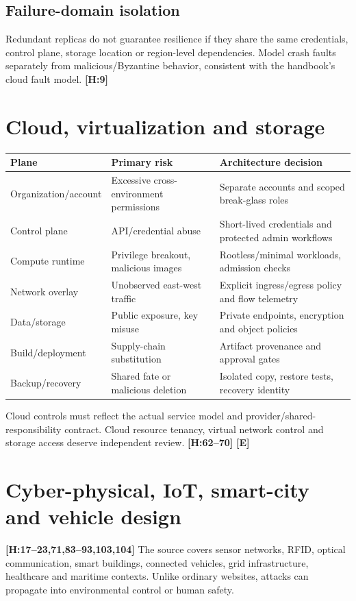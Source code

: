 \documentclass[10pt,letterpaper,oneside]{article}
\newcommand{\handbookref}[1]{\textsf{\color{accent}\textbf{[H:#1]}}}
\newcommand{\modernext}{\textsf{\color{muted}\textbf{[E]}}}
\begin{document}
\subsection{Failure-domain isolation}
Redundant replicas do not guarantee resilience if they share the same credentials, control plane, storage location or region-level dependencies. Model crash faults separately from malicious/Byzantine behavior, consistent with the handbook's cloud fault model. \handbookref{9}

\section{Cloud, virtualization and storage}
\par\medskip\noindent\begin{tabularx}{\textwidth}{@{}p{}X X@{}}\toprule
Plane & Primary risk & Architecture decision \\ \midrule
Organization/account & Excessive cross-environment permissions & Separate accounts and scoped break-glass roles\\
Control plane & API/credential abuse & Short-lived credentials and protected admin workflows\\
Compute runtime & Privilege breakout, malicious images & Rootless/minimal workloads, admission checks\\
Network overlay & Unobserved east-west traffic & Explicit ingress/egress policy and flow telemetry\\
Data/storage & Public exposure, key misuse & Private endpoints, encryption and object policies\\
Build/deployment & Supply-chain substitution & Artifact provenance and approval gates\\
Backup/recovery & Shared fate or malicious deletion & Isolated copy, restore tests, recovery identity\\
\bottomrule\end{tabularx}\par\medskip
Cloud controls must reflect the actual service model and provider/shared-responsibility contract. Cloud resource tenancy, virtual network control and storage access deserve independent review. \handbookref{62--70} \modernext{}

\section{Cyber-physical, IoT, smart-city and vehicle design}
\handbookref{17--23,71,83--93,103,104} The source covers sensor networks, RFID, optical communication, smart buildings, connected vehicles, grid infrastructure, healthcare and maritime contexts. Unlike ordinary websites, attacks can propagate into environmental control or human safety.
\end{document}
